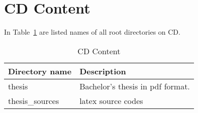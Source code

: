 \section{CD Content}

In Table~\ref{tab:obsah} are listed names of all root directories on CD.

\vspace{1cm}
\begin{table}[!htb]
\centering
\begin{tabular}{lp{10cm}}
\textbf{Directory name} & \textbf{Description} \\

\hline
thesis & Bachelor's thesis in pdf format.\\
thesis\_sources & latex source codes \\
\hline
\end{tabular}
\caption{CD Content}
\label{tab:obsah}
\end{table}